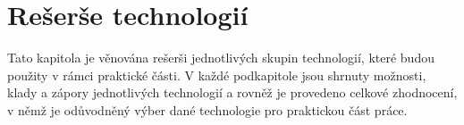 \chapter{Rešerše technologií}
\label{chap:technology-research}

Tato kapitola je věnována rešerši jednotlivých skupin technologií,
které budou použity v rámci praktické části.
V každé podkapitole jsou shrnuty možnosti, klady a zápory jednotlivých
technologií a rovněž je provedeno celkové zhodnocení,
v němž je odůvodněný výber dané technologie pro praktickou část práce.







